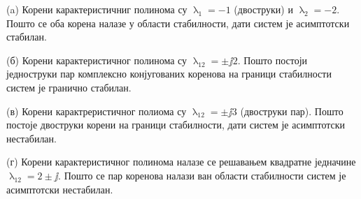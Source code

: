 (a) Корени карактеристичниг полинома су $\uplambda_1 = -1$ (двоструки) и $\uplambda_2 = -2$. Пошто се оба корена 
налазе у области стабилности, дати систем је асимптотски стабилан. 

(б) Корени карактеристичног полинома су $\uplambda_{12} = \pm \jj 2$. Пошто постоји једноструки пар 
комплексно конјугованих коренова на граници стабилности систем је гранично стабилан. 

(в) Корени карактреристичног полиома су $\uplambda_{12} = \pm \jj 3$ (двоструки пар). Пошто постоје двоструки корени 
на граници стабилности, дати систем је асимптотски нестабилан.

(г) Корени карактеристичног полинома налазе се решавањем квадратне једначине 
$\uplambda_{12} = 2 \pm \jj$. Пошто се пар коренова налази ван области стабилности систем је асимптотски нестабилан. 

